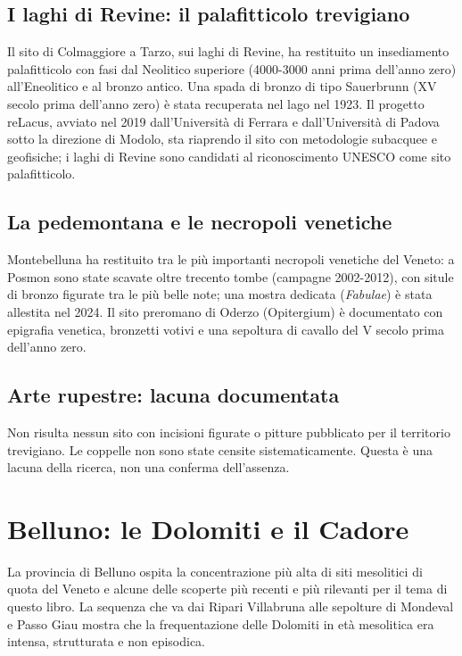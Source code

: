 \subsection{I laghi di Revine: il palafitticolo trevigiano}

Il sito di Colmaggiore a Tarzo, sui laghi di Revine, ha restituito un insediamento palafitticolo con fasi dal Neolitico superiore (4000-3000 anni prima dell'anno zero) all'Eneolitico e al bronzo antico. Una spada di bronzo di tipo Sauerbrunn (XV secolo prima dell'anno zero) è stata recuperata nel lago nel 1923. Il progetto reLacus, avviato nel 2019 dall'Università di Ferrara e dall'Università di Padova sotto la direzione di Modolo, sta riaprendo il sito con metodologie subacquee e geofisiche; i laghi di Revine sono candidati al riconoscimento UNESCO come sito palafitticolo.

\subsection{La pedemontana e le necropoli venetiche}

Montebelluna ha restituito tra le più importanti necropoli venetiche del Veneto: a Posmon sono state scavate oltre trecento tombe (campagne 2002-2012), con situle di bronzo figurate tra le più belle note; una mostra dedicata (\emph{Fabulae}) è stata allestita nel 2024. Il sito preromano di Oderzo (Opitergium) è documentato con epigrafia venetica, bronzetti votivi e una sepoltura di cavallo del V secolo prima dell'anno zero.

\subsection{Arte rupestre: lacuna documentata}

Non risulta nessun sito con incisioni figurate o pitture pubblicato per il territorio trevigiano. Le coppelle non sono state censite sistematicamente. Questa è una lacuna della ricerca, non una conferma dell'assenza.

\section{Belluno: le Dolomiti e il Cadore}

La provincia di Belluno ospita la concentrazione più alta di siti mesolitici di quota del Veneto e alcune delle scoperte più recenti e più rilevanti per il tema di questo libro. La sequenza che va dai Ripari Villabruna alle sepolture di Mondeval e Passo Giau mostra che la frequentazione delle Dolomiti in età mesolitica era intensa, strutturata e non episodica.

